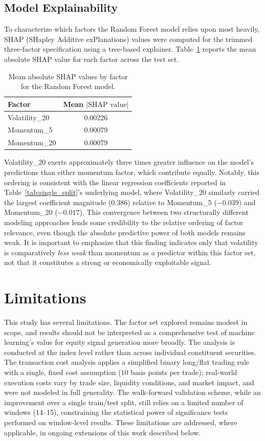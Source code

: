 \documentclass[11pt]{article}
\begin{document}
\subsection{Model Explainability}

To characterize which factors the Random Forest model relies upon most heavily, SHAP (SHapley Additive exPlanations) values were computed for the trimmed three-factor specification using a tree-based explainer. Table~\ref{tab:shap} reports the mean absolute SHAP value for each factor across the test set.

\begin{table}[h]
\centering
\begin{tabular}{lc}
\toprule
Factor & Mean $|\text{SHAP value}|$ \\
\midrule
Volatility\_20 & 0.00226 \\
Momentum\_5 & 0.00079 \\
Momentum\_20 & 0.00079 \\
\bottomrule
\end{tabular}
\caption{Mean absolute SHAP values by factor for the Random Forest model.}
\label{tab:shap}
\end{table}

Volatility\_20 exerts approximately three times greater influence on the model's predictions than either momentum factor, which contribute equally. Notably, this ordering is consistent with the linear regression coefficients reported in Table~\ref{tab:single_split}'s underlying model, where Volatility\_20 similarly carried the largest coefficient magnitude (0.386) relative to Momentum\_5 ($-0.039$) and Momentum\_20 ($-0.017$). This convergence between two structurally different modeling approaches lends some credibility to the relative ordering of factor relevance, even though the absolute predictive power of both models remains weak. It is important to emphasize that this finding indicates only that volatility is comparatively \emph{less weak} than momentum as a predictor within this factor set, not that it constitutes a strong or economically exploitable signal.

\section{Limitations}

This study has several limitations. The factor set explored remains modest in scope, and results should not be interpreted as a comprehensive test of machine learning's value for equity signal generation more broadly. The analysis is conducted at the index level rather than across individual constituent securities. The transaction cost analysis applies a simplified binary long/flat trading rule with a single, fixed cost assumption (10 basis points per trade); real-world execution costs vary by trade size, liquidity conditions, and market impact, and were not modeled in full generality. The walk-forward validation scheme, while an improvement over a single train/test split, still relies on a limited number of windows (14--15), constraining the statistical power of significance tests performed on window-level results. These limitations are addressed, where applicable, in ongoing extensions of this work described below.
\end{document}
